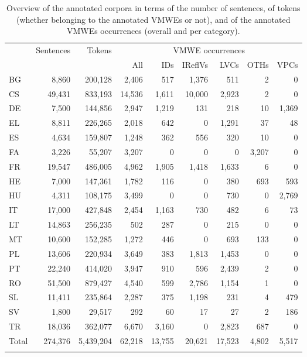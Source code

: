 \documentclass[output=paper,
modfonts,
]{langscibook}
\begin{document}
\begin{table}[htp]
\centering
\setlength{\tabcolsep}{0.9mm}

\begin{tabularx}{.95\textwidth}{lrrrrrrrr}
\lsptoprule
\multirow{2}{*}{Language} & \multirow{2}{*}{Sentences} & \multirow{2}{*}{Tokens} & \multicolumn{6}{c}{VMWE occurrences} \\\cmidrule{4-9}
& & & All & IDs & IReflVs & LVCs & OTHs & VPCs \\
\midrule
BG & 8,860 & 200,128 & 2,406 & 517 & 1,376 & 511 & 2 & 0 \\
CS & 49,431 & 833,193 & 14,536 & 1,611 & 10,000 & 2,923 & 2 & 0 \\
DE & 7,500 & 144,856 & 2,947 & 1,219 & 131 & 218 & 10 & 1,369 \\
EL & 8,811 & 226,265 & 2,018 & 642 & 0 & 1,291 & 37 & 48 \\
ES & 4,634 & 159,807 & 1,248 & 362 & 556 & 320 & 10 & 0 \\
FA & 3,226 & 55,207 & 3,207 & 0 & 0 & 0 & 3,207 & 0 \\
FR & 19,547 & 486,005 & 4,962 & 1,905 & 1,418 & 1,633 & 6 & 0 \\
HE & 7,000 & 147,361 & 1,782 & 116 & 0 & 380 & 693 & 593 \\
HU & 4,311 & 108,175 & 3,499 & 0 & 0 & 730 & 0 & 2,769 \\
IT & 17,000 & 427,848 & 2,454 & 1,163 & 730 & 482  & 6 & 73 \\
LT & 14,863 & 256,235 & 502 & 287 & 0 & 215 & 0 & 0 \\
MT & 10,600 & 152,285 & 1,272 & 446 & 0 & 693 & 133 & 0 \\
PL & 13,606 & 220,934 & 3,649 & 383 & 1,813 & 1,453 & 0 & 0 \\
PT & 22,240 & 414,020 & 3,947 & 910 & 596 & 2,439  & 2 & 0 \\
RO & 51,500 & 879,427 & 4,540 & 599 & 2,786 & 1,154 & 1 & 0 \\
SL & 11,411 & 235,864 & 2,287 & 375 & 1,198 & 231 & 4 & 479 \\
SV & 1,800 & 29,517 & 292 & 60 & 17 & 27 & 2 & 186 \\
TR & 18,036 & 362,077 & 6,670 & 3,160 & 0 & 2,823 & 687 & 0 \\
\midrule
Total & 274,376 & 5,439,204 & 62,218 & 13,755 & 20,621 & 17,523 & 4,802 & 5,517 \\
\lspbottomrule       
\end{tabularx}
\caption{Overview of the annotated corpora in terms of the number of sentences, of tokens (whether belonging to the annotated VMWEs or not), and of the annotated VMWEs occurrences (overall and per category).}\label{tab:corpora-overview}
\end{table}
\end{document}
